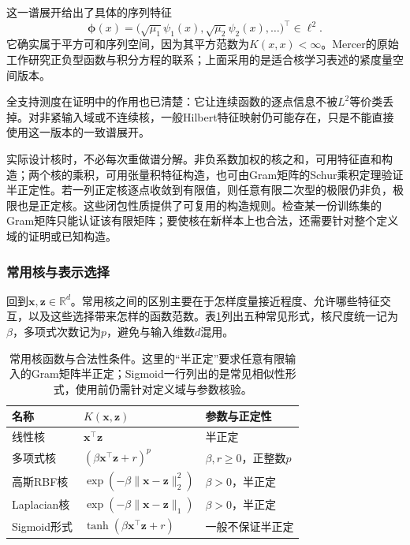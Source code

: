 这一谱展开给出了具体的序列特征
\[
  \bm{\phi}(x)
  =\bigl(\sqrt{\mu_1}\psi_1(x),
          \sqrt{\mu_2}\psi_2(x),\ldots\bigr)^{\top}\in\ell^2.
\]
它确实属于平方可和序列空间，因为其平方范数为$K(x,x)<\infty$。Mercer的原始工作研究正负型函数与积分方程的联系；上面采用的是适合核学习表述的紧度量空间版本。

全支持测度在证明中的作用也已清楚：它让连续函数的逐点信息不被$L^2$等价类丢掉。对非紧输入域或不连续核，一般Hilbert特征映射仍可能存在，只是不能直接使用这一版本的一致谱展开。

实际设计核时，不必每次重做谱分解。非负系数加权的核之和，可用特征直和构造；两个核的乘积，可用张量积特征构造，也可由Gram矩阵的Schur乘积定理验证半正定性。若一列正定核逐点收敛到有限值，则任意有限二次型的极限仍非负，极限也是正定核。这些闭包性质提供了可复用的构造规则。检查某一份训练集的Gram矩阵只能认证该有限矩阵；要使核在新样本上也合法，还需要针对整个定义域的证明或已知构造。

\subsubsection{常用核与表示选择}
\label{sec:classic-overview-common-kernels}
\label{sec:classification-svm-common-kernels}

回到$\bm{x},\bm{z}\in\mathbb{R}^d$。常用核之间的区别主要在于怎样度量接近程度、允许哪些特征交互，以及这些选择带来怎样的函数范数。表\ref{tab:classification-svm-kernels}列出五种常见形式，核尺度统一记为$\beta$，多项式次数记为$p$，避免与输入维数$d$混用。

\begin{table}[htbp]
  \centering
  \small
  \begin{tabularx}{\linewidth}{@{}>{\RaggedRight\arraybackslash}p{18mm}>{\RaggedRight\arraybackslash}X>{\RaggedRight\arraybackslash}p{27mm}@{}}
    \toprule
    名称 & $K(\bm{x},\bm{z})$ & 参数与正定性\\
    \midrule
    线性核 & $\bm{x}^{\top}\bm{z}$ & 半正定\\
    多项式核 & $(\beta\bm{x}^{\top}\bm{z}+r)^p$ & $\beta,r\ge0$，正整数$p$\\
    高斯RBF核 & $\exp(-\beta\lVert\bm{x}-\bm{z}\rVert_2^2)$ & $\beta>0$，半正定\\
    Laplacian核 & $\exp(-\beta\lVert\bm{x}-\bm{z}\rVert_1)$ & $\beta>0$，半正定\\
    Sigmoid形式 & $\tanh(\beta\bm{x}^{\top}\bm{z}+r)$ & 一般不保证半正定\\
    \bottomrule
  \end{tabularx}
  \caption{常用核函数与合法性条件。这里的“半正定”要求任意有限输入的Gram矩阵半正定；Sigmoid一行列出的是常见相似性形式，使用前仍需针对定义域与参数核验。}
  \label{tab:classification-svm-kernels}
\end{table}

